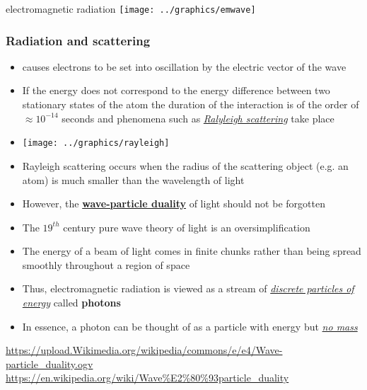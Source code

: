 \documentclass[a4paper,12pt,titlepage]{article}
\begin{document}
\begin{frame}{electromagnetic radiation}
\texttt{[image: ../graphics/emwave]}
\end{frame}
	

\begin{frame}[allowframebreaks]
\frametitle{Radiation and scattering}
\begin{itemize}
\item {\color{red}{Electromagnetic radiation}} causes electrons to be set into oscillation by the electric vector of the wave
\item If the energy does not correspond to the energy difference between two stationary states of the atom the duration of the interaction is of the order of \(\approx 10^{-14}\) seconds and phenomena such as \textit{\underline{Ralyleigh scattering}} take place
\item[] \texttt{[image: ../graphics/rayleigh]}
\item Rayleigh scattering occurs when the radius of the scattering object (e.g. an atom) is much smaller than the wavelength of light 
\end{itemize}
\end{frame}

\begin{frame}
\begin{itemize}
\item However, the \textbf{\underline{wave-particle duality}} of light should not be forgotten
\item The \(19^{th}\) century pure wave theory of light is an oversimplification
\item The energy of a beam of light comes in finite chunks rather than being spread smoothly throughout a region of space
\item Thus, electromagnetic radiation is viewed as a stream of \textit{\underline{discrete particles of energy}} called \textbf{\color{red}photons}
\item In essence, a photon can be thought of as a particle with energy but \textit{\underline{no mass}}
\end{itemize}
\url{https://upload.Wikimedia.org/wikipedia/commons/e/e4/Wave-particle_duality.ogv} \newline
\url{https://en.wikipedia.org/wiki/Wave\%E2\%80\%93particle_duality}
\end{frame}

\vspace{1in}
\end{document}
